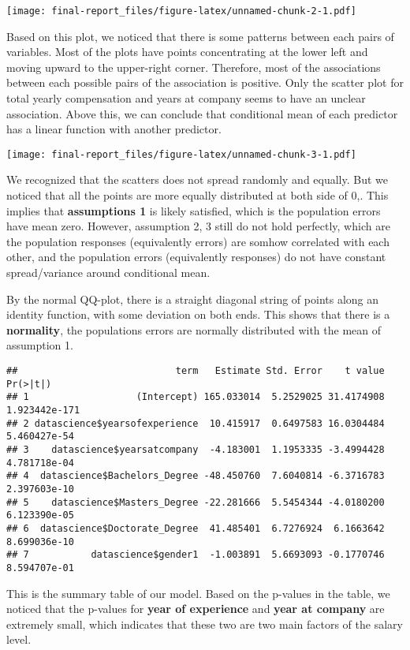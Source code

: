 \documentclass[
]{article}
\begin{document}
\texttt{[image: final-report\_files/figure-latex/unnamed-chunk-2-1.pdf]}

Based on this plot, we noticed that there is some patterns between each
pairs of variables. Most of the plots have points concentrating at the
lower left and moving upward to the upper-right corner. Therefore, most
of the associations between each possible pairs of the association is
positive. Only the scatter plot for total yearly compensation and years
at company seems to have an unclear association. Above this, we can
conclude that conditional mean of each predictor has a linear function
with another predictor.

\texttt{[image: final-report\_files/figure-latex/unnamed-chunk-3-1.pdf]}

We recognized that the scatters does not spread randomly and equally.
But we noticed that all the points are more equally distributed at both
side of 0,. This implies that \textbf{assumptions 1} is likely
satisfied, which is the population errors have mean zero. However,
assumption 2, 3 still do not hold perfectly, which are the population
responses (equivalently errors) are somhow correlated with each other,
and the population errors (equivalently responses) do not have constant
spread/variance around conditional mean.

By the normal QQ-plot, there is a straight diagonal string of points
along an identity function, with some deviation on both ends. This shows
that there is a \textbf{normality}, the populations errors are normally
distributed with the mean of assumption 1.

\begin{verbatim}
##                            term   Estimate Std. Error    t value      Pr(>|t|)
## 1                   (Intercept) 165.033014  5.2529025 31.4174908 1.923442e-171
## 2 datascience$yearsofexperience  10.415917  0.6497583 16.0304484  5.460427e-54
## 3    datascience$yearsatcompany  -4.183001  1.1953335 -3.4994428  4.781718e-04
## 4  datascience$Bachelors_Degree -48.450760  7.6040814 -6.3716783  2.397603e-10
## 5    datascience$Masters_Degree -22.281666  5.5454344 -4.0180200  6.123390e-05
## 6  datascience$Doctorate_Degree  41.485401  6.7276924  6.1663642  8.699036e-10
## 7           datascience$gender1  -1.003891  5.6693093 -0.1770746  8.594707e-01
\end{verbatim}

This is the summary table of our model. Based on the p-values in the
table, we noticed that the p-values for \textbf{year of experience} and
\textbf{year at company} are extremely small, which indicates that these
two are two main factors of the salary level.
\end{document}
